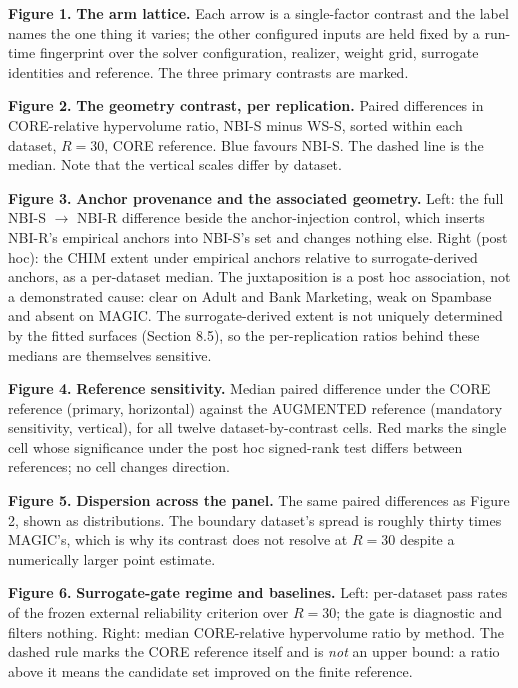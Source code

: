 
\noindent\textbf{Figure 1.} \textbf{The arm lattice.} Each arrow is a single-factor contrast and the label names the one thing it varies; the other configured inputs are held fixed by a run-time fingerprint over the solver configuration, realizer, weight grid, surrogate identities and reference. The three primary contrasts are marked.\par\medskip
\noindent\textbf{Figure 2.} \textbf{The geometry contrast, per replication.} Paired differences in CORE-relative hypervolume ratio, NBI-S minus WS-S, sorted within each dataset, $R = 30$, CORE reference. Blue favours NBI-S. The dashed line is the median. Note that the vertical scales differ by dataset.\par\medskip
\noindent\textbf{Figure 3.} \textbf{Anchor provenance and the associated geometry.} Left: the full NBI-S $\rightarrow$ NBI-R difference beside the anchor-injection control, which inserts NBI-R's empirical anchors into NBI-S's set and changes nothing else. Right (post hoc): the CHIM extent under empirical anchors relative to surrogate-derived anchors, as a per-dataset median. The juxtaposition is a post hoc association, not a demonstrated cause: clear on Adult and Bank Marketing, weak on Spambase and absent on MAGIC. The surrogate-derived extent is not uniquely determined by the fitted surfaces (Section 8.5), so the per-replication ratios behind these medians are themselves sensitive.\par\medskip
\noindent\textbf{Figure 4.} \textbf{Reference sensitivity.} Median paired difference under the CORE reference (primary, horizontal) against the AUGMENTED reference (mandatory sensitivity, vertical), for all twelve dataset-by-contrast cells. Red marks the single cell whose significance under the post hoc signed-rank test differs between references; no cell changes direction.\par\medskip
\noindent\textbf{Figure 5.} \textbf{Dispersion across the panel.} The same paired differences as Figure 2, shown as distributions. The boundary dataset's spread is roughly thirty times MAGIC's, which is why its contrast does not resolve at $R = 30$ despite a numerically larger point estimate.\par\medskip
\noindent\textbf{Figure 6.} \textbf{Surrogate-gate regime and baselines.} Left: per-dataset pass rates of the frozen external reliability criterion over $R = 30$; the gate is diagnostic and filters nothing. Right: median CORE-relative hypervolume ratio by method. The dashed rule marks the CORE reference itself and is \emph{not} an upper bound: a ratio above it means the candidate set improved on the finite reference.\par\medskip
